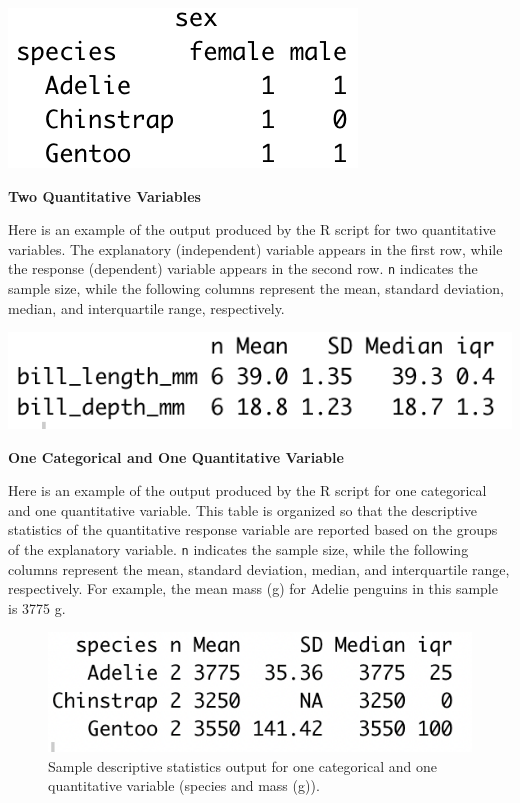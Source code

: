 \documentclass[
]{book}
\begin{document}
\includegraphics{images/categorical-categorical_stats_example.png}

\textbf{Two Quantitative Variables}

Here is an example of the output produced by the R script for two quantitative variables. The explanatory (independent) variable appears in the first row, while the response (dependent) variable appears in the second row. \texttt{n} indicates the sample size, while the following columns represent the mean, standard deviation, median, and interquartile range, respectively.

\includegraphics{images/quantitative_quantitative_stats_example.png}

\textbf{One Categorical and One Quantitative Variable}

Here is an example of the output produced by the R script for one categorical and one quantitative variable. This table is organized so that the descriptive statistics of the quantitative response variable are reported based on the groups of the explanatory variable. \texttt{n} indicates the sample size, while the following columns represent the mean, standard deviation, median, and interquartile range, respectively. For example, the mean mass (g) for Adelie penguins in this sample is 3775 g.

\begin{figure}
\centering
\includegraphics{images/quantitative-categorical_stats_example.png}
\caption{Sample descriptive statistics output for one categorical and one quantitative variable (species and mass (g)).}
\end{figure}
\end{document}
